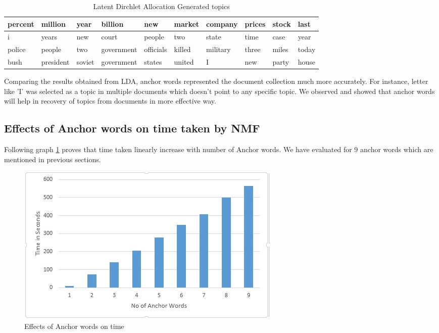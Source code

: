 \documentclass[a4paper,11pt]{article}
\begin{document}
\begin{table}[h]
    \begin{tabular}{|l|l|l|l|l|l|l|l|l|l|}
    \hline
    percent & million   & year   & billion    & new       & market & company  & prices & stock & last  \\ \hline
    i       & years     & new    & court      & people    & two    & state    & time   & case  & year  \\ \hline
    police  & people    & two    & government & officials & killed & military & three  & miles & today \\ \hline
    bush    & president & soviet & government & states    & united & I        & new    & party & house \\ \hline
    \end{tabular}
    \caption {Latent Dirchlet Allocation Generated topics}
\end{table}

Comparing the results obtained from LDA, anchor words represented the document collection much more accurately. For instance, letter like 'I' was selected as a topic in multiple documents which doesn't point to any specific topic. We observed and showed that anchor words will help in recovery of topics from documents in more effective way. 

\subsection{Effects of Anchor words on time taken by NMF}

Following graph \ref{fig:anchor_words} proves that time taken linearly increase with number of Anchor words. We have evaluated for 9 anchor words which are mentioned in previous sections. 

\begin{figure}[htb]
\includegraphics[scale=0.5]{anchor_words.jpg}
\caption{Effects of Anchor words on time}
\label{fig:anchor_words}
\end{figure}
\end{document}
